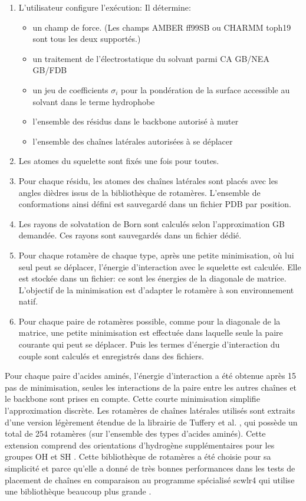 \begin{enumerate}
\item L'utilisateur configure l'exécution:
Il détermine:
\begin{itemize}
\item un champ de force. (Les champs AMBER ff99SB ou CHARMM toph19 sont tous les deux supportés.)
\item un traitement de l'électrostatique du solvant parmi CA GB/NEA GB/FDB
\item un jeu de coefficients $\sigma_i$ pour la pondération de la surface accessible au solvant dans le terme hydrophobe
\item l'ensemble des résidus dans le backbone autorisé à muter
\item l'ensemble des chaînes latérales autorisées à se déplacer 
\end{itemize}

\item Les atomes du squelette sont fixés une fois pour toutes.

\item Pour chaque résidu, les atomes des chaînes latérales sont placés avec les angles dièdres issus de la bibliothèque de rotamères. L'ensemble de conformations ainsi défini est sauvegardé dans un fichier PDB par position.

\item Les rayons de solvatation de Born sont calculés selon l'approximation GB demandée. Ces rayons sont sauvegardés dans un fichier dédié.

\item Pour chaque rotamère de chaque type, après une petite minimisation, où lui seul peut se déplacer, l'énergie d'interaction avec le squelette est calculée. Elle est stockée dans un fichier: ce sont les énergies de la diagonale de matrice. L'objectif de la minimisation est d'adapter le rotamère à son environnement natif.

\item Pour chaque paire de rotamères possible, comme pour la diagonale de la matrice, une petite minimisation est effectuée dans laquelle seule la paire courante qui peut se déplacer. Puis les termes d'énergie d'interaction du couple sont calculés et enregistrés dans des fichiers.  
\end{enumerate}

Pour chaque paire d'acides aminés, l'énergie d'interaction a été obtenue après 15 pas de minimisation, seules les interactions de la paire entre les autres chaînes et le backbone sont prises en compte. Cette courte minimisation simplifie l'approximation discrète. Les rotamères de chaînes latérales utilisés sont extraits d'une version légèrement étendue de la librairie de Tuffery et al. \cite{Tuffery91}, qui possède un total de 254 rotamères (sur l'ensemble des types d'acides aminés). Cette extension comprend des orientations d'hydrogène supplémentaires pour les groupes OH et SH \cite{Gaillard14}. Cette bibliothèque de rotamères a été choisie pour sa simplicité et parce qu'elle a donné de très bonnes performances dans les tests de placement de chaînes en comparaison au programme spécialisé scwlr4 qui utilise une bibliothèque beaucoup plus grande \cite{Krivov09,Gaillard16}.

